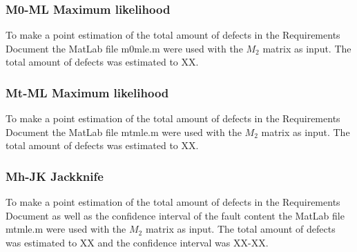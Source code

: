 \subsubsection{M0-ML Maximum likelihood}
To make a point estimation of the total amount of defects in the Requirements Document the MatLab file m0mle.m were used with the $M_{2}$ matrix as input. The total amount of defects was estimated to XX.
\subsubsection{Mt-ML Maximum likelihood}
To make a point estimation of the total amount of defects in the Requirements Document the MatLab file mtmle.m were used with the $M_{2}$ matrix as input. The total amount of defects was estimated to XX.
\subsubsection{Mh-JK Jackknife}
To make a point estimation of the total amount of defects in the Requirements Document as well as the confidence interval of the fault content the MatLab file mtmle.m were used with the $M_{2}$ matrix as input. The total amount of defects was estimated to XX and the confidence interval was XX-XX.